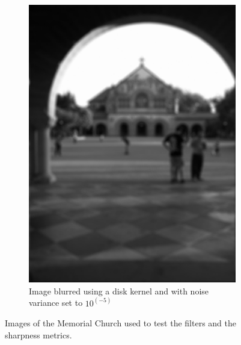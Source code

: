 \begin{figure}[H]
\begin{subfigure}[b]{0.35\textwidth}
                         \includegraphics[width=\textwidth]{memchu_blur_noise.jpg}
                         \caption{Image blurred using a disk kernel and with noise variance set to $10^(-5)$  }\label{fig:base_images_noise}
        \end{subfigure}
        
        \caption{Images of the Memorial Church used to test the filters and the sharpness metrics.}
        \label{fig:base_images}
\end{figure}

